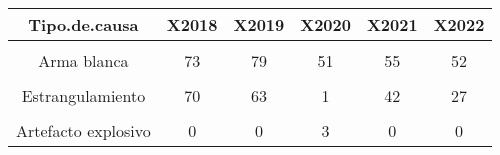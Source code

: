 \begin{tabular}[t]{cccccc}
\toprule
\textbf{Tipo.de.causa} & \textbf{X2018} & \textbf{X2019} & \textbf{X2020} & \textbf{X2021} & \textbf{X2022}\\
\midrule
\cellcolor[HTML]{B6B3FF}{Arma de fuego} & \cellcolor[HTML]{B6B3FF}{386} & \cellcolor[HTML]{B6B3FF}{372} & \cellcolor[HTML]{B6B3FF}{238} & \cellcolor[HTML]{B6B3FF}{299} & \cellcolor[HTML]{B6B3FF}{341}\\
Arma blanca & 73 & 79 & 51 & 55 & 52\\
\cellcolor[HTML]{B6B3FF}{Arma contundente} & \cellcolor[HTML]{B6B3FF}{41} & \cellcolor[HTML]{B6B3FF}{37} & \cellcolor[HTML]{B6B3FF}{25} & \cellcolor[HTML]{B6B3FF}{17} & \cellcolor[HTML]{B6B3FF}{14}\\
Estrangulamiento & 70 & 63 & 1 & 42 & 27\\
\cellcolor[HTML]{B6B3FF}{Linchamiento} & \cellcolor[HTML]{B6B3FF}{0} & \cellcolor[HTML]{B6B3FF}{1} & \cellcolor[HTML]{B6B3FF}{40} & \cellcolor[HTML]{B6B3FF}{0} & \cellcolor[HTML]{B6B3FF}{3}\\
Artefacto explosivo & 0 & 0 & 3 & 0 & 0\\
\bottomrule
\end{tabular}
